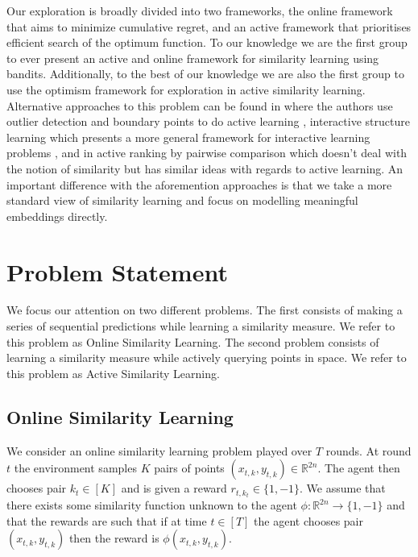 \documentclass{article}
\begin{document}
Our exploration is broadly divided into two frameworks, the online framework that aims to minimize cumulative regret, and an active framework that prioritises efficient search of the optimum function.
To our knowledge we are the first group to ever present an active and online framework for similarity learning using bandits.
Additionally, to the best of our knowledge we are also the first group to use the optimism framework for exploration in active similarity learning.
Alternative approaches to this problem can be found in \cite{active-learning} where the authors use outlier detection and boundary points to do active learning
, interactive structure learning \cite{SQBC} which presents a more general framework for interactive learning problems
, and in  active ranking by pairwise comparison \cite{ranking} which doesn't deal with the notion of similarity but has similar ideas with regards to active learning.
An important difference with the aforemention approaches is that we take a more standard view of similarity learning and focus on modelling meaningful embeddings directly.


\section{Problem Statement}
\label{problem-statement}
We focus our attention on two different problems.
The first consists of making a series of sequential predictions while learning a
similarity measure. We refer to this problem as Online Similarity Learning.
The second problem consists of learning a similarity measure while actively querying points in space.
We refer to this problem as Active Similarity Learning.

\subsection{Online Similarity Learning}
\label{problem-statement:online-similarity-learning}
We consider an online similarity learning problem played over $T$ rounds.
At round $t$ the environment samples $K$ pairs of points $(x_{t,k}, y_{t,k}) \in \mathbb{R}^{2n}$.
The agent then chooses pair $k_t \in [K]$ and is given a reward $r_{t,k_{t}} \in \{1, -1\}$.
We assume that there exists some similarity function unknown to the agent $\phi: \mathbb{R}^{2n} \to \{1, -1\}$
and that the rewards are such that if at time $t \in [T]$ the agent chooses pair $(x_{t,k}, y_{t,k})$
then the reward is $\phi(x_{t,k}, y_{t,k})$.
\end{document}
